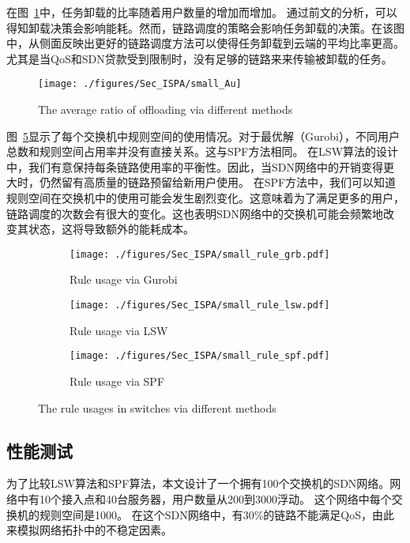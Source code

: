 在图~\ref{fig_smallAu}中，任务卸载的比率随着用户数量的增加而增加。 通过前文的分析，可以得知卸载决策会影响能耗。然而，链路调度的策略会影响任务卸载的决策。在该图中，从侧面反映出更好的链路调度方法可以使得任务卸载到云端的平均比率更高。尤其是当QoS和SDN贷款受到限制时，没有足够的链路来来传输被卸载的任务。

\begin{figure}[!h]
\centering
\texttt{[image: ./figures/Sec\_ISPA/small\_Au]}
\vspace{-1em}
\caption{The average ratio of offloading via different methods}
\vspace{-1.5em}
\label{fig_smallAu}
\end{figure}

图~\ref{fig_smallrule}显示了每个交换机中规则空间的使用情况。对于最优解（Gurobi），不同用户总数和规则空间占用率并没有直接关系。这与SPF方法相同。 在LSW算法的设计中，我们有意保持每条链路使用率的平衡性。因此，当SDN网络中的开销变得更大时，仍然留有高质量的链路预留给新用户使用。 在SPF方法中，我们可以知道规则空间在交换机中的使用可能会发生剧烈变化。这意味着为了满足更多的用户，链路调度的次数会有很大的变化。这也表明SDN网络中的交换机可能会频繁地改变其状态，这将导致额外的能耗成本。

\begin{figure}[!h]
  \centering
  \begin{subfigure}[h]{0.99\linewidth}
    \texttt{[image: ./figures/Sec\_ISPA/small\_rule\_grb.pdf]}
    \label{fig_smallNetworkRG}
    \caption{Rule usage via Gurobi}
  \end{subfigure}
  \begin{subfigure}[h]{0.99\linewidth}
    \texttt{[image: ./figures/Sec\_ISPA/small\_rule\_lsw.pdf]}
    \label{fig_smallNetworkRL}
    \caption{Rule usage via LSW}
  \end{subfigure}
  \begin{subfigure}[h]{0.99\linewidth}
    \texttt{[image: ./figures/Sec\_ISPA/small\_rule\_spf.pdf]}
    \label{fig_smallNetworkRS}
    \caption{Rule usage via SPF}
  \end{subfigure}
  \caption{The rule usages in switches via different methods}
  \label{fig_smallrule}
\end{figure}

\subsection{性能测试}

为了比较LSW算法和SPF算法，本文设计了一个拥有100个交换机的SDN网络。网络中有10个接入点和40台服务器，用户数量从200到3000浮动。 这个网络中每个交换机的规则空间是1000。 在这个SDN网络中，有30\%的链路不能满足QoS，由此来模拟网络拓扑中的不稳定因素。


